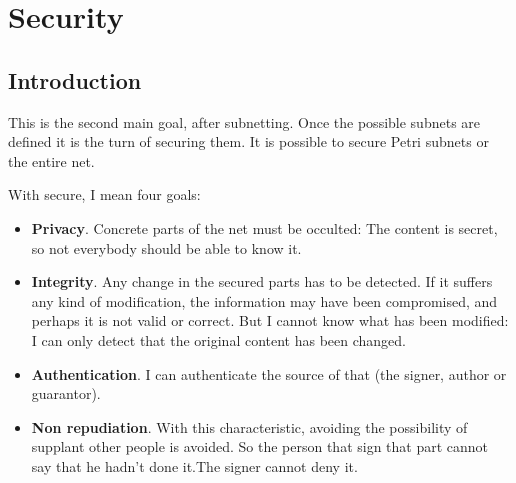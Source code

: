 
\chapter{Security} %

\label{Chapter: Security} %


\section{Introduction}

This is the second main goal, after subnetting. Once the possible subnets are defined it is the turn of securing them. It is possible to secure Petri subnets or the entire net.

With secure, I mean four goals:
\begin{itemize}
\item \textbf{Privacy}. Concrete parts of the net must be occulted: The content is secret, so not everybody should be able to know it.
\item \textbf{Integrity}. Any change in the secured parts has to be detected.
If it suffers any kind of modification, the information may have been compromised,
and perhaps it is not valid or correct. But I cannot know what has been modified:
I can only detect that the original content has been changed.
\item \textbf{Authentication}. I can authenticate the source of that (the signer,
author or guarantor).
\item \textbf{Non repudiation}. With this characteristic, avoiding the possibility of supplant other people is avoided. So the person that sign that part cannot
say that he hadn't done it.The signer cannot deny  it. 

\end{itemize}

